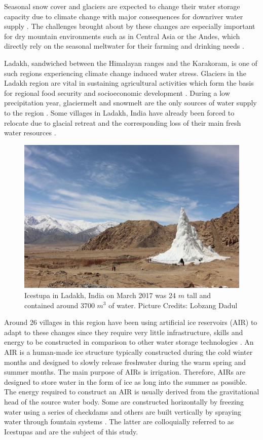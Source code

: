 \documentclass[utf8]{frontiersSCNS}
\begin{document}
Seasonal snow cover and glaciers are expected to change their water storage capacity due to climate
change with major consequences for downriver water supply \citep{Immerzeel_2020}. The challenges brought about
by these changes are especially important for dry mountain environments such as in Central Asia or the Andes,
which directly rely on the seasonal meltwater for their farming and drinking needs \citep{HoelzleBarandun_2019,
	Apel_2018, Buytaert_2017, Chen_2016, UNGERSHAYESTEH_2013}.

Ladakh, sandwiched between the Himalayan ranges and the Karakoram, is one of such regions experiencing climate
change induced water stress. Glaciers in the Ladakh region are vital in sustaining agricultural activities which
form the basis for regional food security and socioeconomic development \citep{Labbal_2000, Schmidt_2012}.
During a low precipitation year, glaciermelt and snowmelt are the only sources of water supply to the region
\citep{Thayyen_2010}. Some villages in Ladakh, India have already been forced to relocate due to glacial retreat
and the corresponding loss of their main fresh water resources \citep{zanskar}.

\begin{figure}
	\begin{center}
		\includegraphics[width=10 cm]{Figures/Figure_1.jpg}
	\end{center}
	\caption{Icestupa in Ladakh, India on March 2017 was 24 $m$ tall and contained around 3700 $m^3$
		of water. Picture Credits: Lobzang Dadul}
	\label{fig:old_icestupa}
\end{figure}

Around 26 villages in this region have been using artificial ice reservoirs (AIR) to adapt to these changes since
they require very little infrastructure, skills and energy to be constructed in comparison to other water
storage technologies \citep{IPCC_2019,10.1659/MRD-JOURNAL-D-18-00072.1, campaign}. An AIR is a human-made ice
structure typically constructed during the cold winter months and designed to slowly release freshwater during
the warm spring and summer months.  The main purpose of AIRs is irrigation. Therefore, AIRs are designed to
store water in the form of ice as long into the summer as possible. The energy required to construct an AIR is
usually derived from the gravitational head of the source water body. Some are constructed horizontally by
freezing water using a series of checkdams and others are built vertically by spraying water through fountain
systems \citep{Nusser_2018}. The latter are colloquially referred to as Icestupas and are the subject of this
study.
\end{document}
